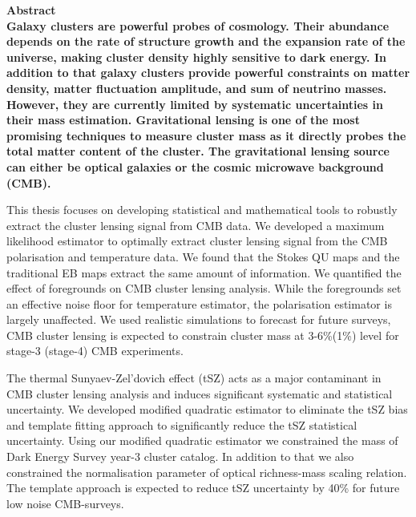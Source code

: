\bfseries{Abstract}\mdseries\\                                                                                                
                                                                                                                             

Galaxy clusters are powerful probes of cosmology. 
Their abundance depends on the rate of structure growth and the expansion rate of the universe, making cluster density highly sensitive to dark energy. 
In addition to that galaxy clusters provide powerful constraints on matter density, matter fluctuation amplitude, and sum of neutrino masses.
 However, they are currently limited by systematic uncertainties in their mass estimation.
 Gravitational lensing is one of the most promising techniques to measure cluster mass as it directly probes the total matter content of the cluster. 
 The gravitational lensing source can either be optical galaxies or the cosmic microwave background (CMB). %
 
 This thesis focuses on developing statistical and mathematical tools to robustly extract the cluster lensing signal from CMB data. 
 We developed a maximum likelihood estimator to optimally extract cluster lensing signal from the CMB polarisation and temperature data. 
 We found that the Stokes QU maps and the traditional EB maps extract the same amount of information. 
  We quantified the effect of foregrounds on CMB cluster lensing analysis. %
  While the foregrounds set an effective noise floor for temperature estimator, the polarisation estimator is largely unaffected. 
  We used realistic simulations to forecast for future surveys, CMB cluster lensing is expected to constrain cluster mass at 3-6\%(1\%) level for stage-3 (stage-4) CMB experiments. 
  
  The thermal Sunyaev-Zel'dovich effect (tSZ) acts as a major contaminant in CMB cluster lensing analysis and induces significant systematic and statistical uncertainty.
   We developed modified quadratic estimator to eliminate the tSZ bias and template fitting approach to significantly reduce the tSZ statistical uncertainty.
  Using our modified quadratic estimator we constrained the mass of Dark Energy Survey year-3 cluster catalog. In addition to that we also constrained the normalisation parameter of optical richness-mass scaling relation. 
  The template approach is expected to reduce tSZ uncertainty by 40\% for future low noise CMB-surveys.  
  
